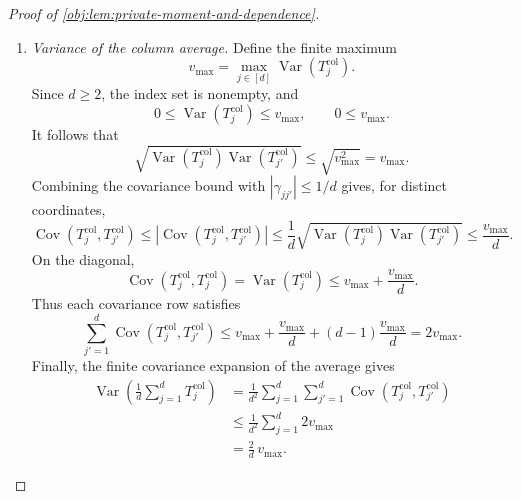 \begin{proof}[Proof of \cref{obj:lem:private-moment-and-dependence}]
\begin{enumerate}
\item \textit{Variance of the column average.}
Define the finite maximum
\[
v_{\max}
=
\max_{j\in[d]}\operatorname{Var}(T_j^{\mathrm{col}}).
\]
Since \(d\ge2\), the index set is nonempty, and
\[
0\le\operatorname{Var}(T_j^{\mathrm{col}})\le v_{\max},
\qquad
0\le v_{\max}.
\]
It follows that
\[
\sqrt{\operatorname{Var}(T_j^{\mathrm{col}})
      \operatorname{Var}(T_{j'}^{\mathrm{col}})}
\le\sqrt{v_{\max}^2}=v_{\max}.
\]
Combining the covariance bound with
\(|\gamma_{jj'}|\le1/d\) gives, for distinct coordinates,
\[
\operatorname{Cov}(T_j^{\mathrm{col}},T_{j'}^{\mathrm{col}})
\le
\left|\operatorname{Cov}(T_j^{\mathrm{col}},T_{j'}^{\mathrm{col}})\right|
\le
\frac1d
\sqrt{\operatorname{Var}(T_j^{\mathrm{col}})
      \operatorname{Var}(T_{j'}^{\mathrm{col}})}
\le
\frac{v_{\max}}d.
\]
On the diagonal,
\[
\operatorname{Cov}(T_j^{\mathrm{col}},T_j^{\mathrm{col}})
=
\operatorname{Var}(T_j^{\mathrm{col}})
\le v_{\max}+\frac{v_{\max}}d.
\]
Thus each covariance row satisfies
\[
\sum_{j'=1}^d
\operatorname{Cov}(T_j^{\mathrm{col}},T_{j'}^{\mathrm{col}})
\le
v_{\max}+\frac{v_{\max}}d
+(d-1)\frac{v_{\max}}d
=
2v_{\max}.
\]
Finally, the finite covariance expansion of the average gives
\[
\begin{aligned}
\operatorname{Var}\left(\frac1d\sum_{j=1}^dT_j^{\mathrm{col}}\right)
&=
\frac1{d^2}\sum_{j=1}^d\sum_{j'=1}^d
\operatorname{Cov}(T_j^{\mathrm{col}},T_{j'}^{\mathrm{col}})\\
&\le
\frac1{d^2}\sum_{j=1}^d2v_{\max}\\
&=
\frac2d\,v_{\max}.
\end{aligned}
\]
\end{enumerate}
\end{proof}

